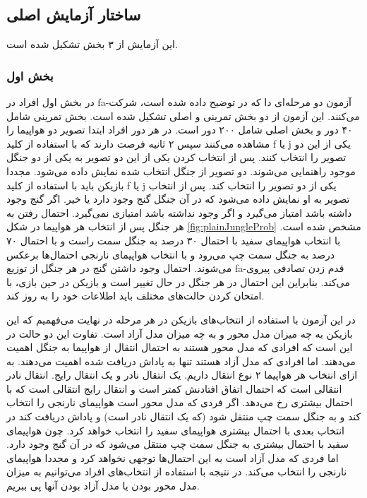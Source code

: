 \documentclass[twoside, a4paper,11pt]{book}
\numberwithin{equation}{chapter}
\numberwithin{table}{chapter}
\numberwithin{figure}{chapter}
\numberwithin{equation}{chapter}
\newcommand{\mls}[1]{\gls{fa-#1}\glsuseri{la-#1}}
\begin{document}
\subsection{ساختار آزمایش اصلی} \label{partTwoMainTest}

این آزمایش از ۳ بخش تشکیل شده است.
\subsubsection{بخش اول}
در بخش اول افراد در \mls{آزمون دو مرحله‌ای دا} که در \cite{daw2011ModelBased} توضیح داده شده است، شرکت می‌کنند. این آزمون از دو بخش تمرینی و اصلی تشکیل شده است. بخش تمرینی شامل ۴۰ دور و بخش اصلی شامل ۲۰۰ دور است. در هر دور افراد ابتدا تصویر دو هواپیما را مشاهده می‌کنند سپس ۲ ثانیه فرصت دارند که با استفاده از کلید f یا j یکی از این دو تصویر را انتخاب کنند. پس از انتخاب کردن یکی از این دو تصویر به یکی از دو جنگل موجود راهنمایی می‌شوند. دو تصویر از جنگل انتخاب شده نمایش داده می‌شود. مجددا بازیکن باید با استفاده از کلید f  یا j یکی از دو تصویر را انتخاب کند. پس از انتخاب تصویر به او نمایش داده می‌شود که در آن جنگل گنج وجود دارد یا خیر. اگر گنج وجود داشته باشد امتیاز می‌گیرد و اگر وجود نداشته باشد امتیازی نمی‌گیرد.
احتمال رفتن به هر جنگل پس از انتخاب هر هواپیما در شکل \ref{fig:plainJungleProb} مشخص شده است. با انتخاب هواپیمای سفید با احتمال ۳۰ درصد به جنگل سمت راست و با احتمال ۷۰ درصد به جنگل سمت چپ می‌رود و با انتخاب هواپیمای نارنجی احتمال‌ها برعکس می‌شوند.
احتمال وجود داشتن گنج در هر جنگل از توزیع \mls{قدم زدن تصادفی} پیروی می‌کند. بنابراین این احتمال در هر جنگل در حال تغییر است و بازیکن در حین بازی، با امتحان کردن حالت‌های مختلف باید اطلاعات خود را به روز کند.

در این آزمون با استفاده از انتخاب‌های بازیکن در هر مرحله در نهایت می‌فهمیم که این بازیکن به چه میزان مدل محور و به چه میزان مدل آزاد است. تفاوت این دو حالت در این است که افرادی که مدل محور هستند به احتمال انتقال از هواپیما به جنگل اهمیت می‌دهند. اما افرادی که مدل آزاد هستند تنها به پاداش دریافت شده اهمیت می‌دهند. به ازای انتخاب هر هواپیما ۲ نوع انتقال داریم. یک انتقال نادر و یک انتقال رایج. انتقال نادر انتقالی است که احتمال اتفاق افتادنش کمتر است و انتقال رایج انتقالی است که با احتمال بیشتری رخ می‌دهد. اگر فردی که مدل محور است هواپیمای نارنجی را انتخاب کند و به جنگل سمت چپ منتقل شود (که یک انتقال نادر است) و پاداش دریافت کند در انتخاب بعدی با احتمال بیشتری هواپیمای سفید را انتخاب خواهد کرد. چون هواپیمای سفید با احتمال بیشتری به جنگل سمت چپ منتقل می‌شود که در آن گنج وجود دارد. اما فردی که مدل آزاد است به این احتمال‌ها توجهی نخواهد کرد و مجددا هواپیمای نارنجی را انتخاب می‌کند. در نتیجه با استفاده از انتخاب‌های افراد می‌توانیم به میزان مدل محور بودن یا مدل آزاد بودن آنها پی ببریم.
 
\end{document}
